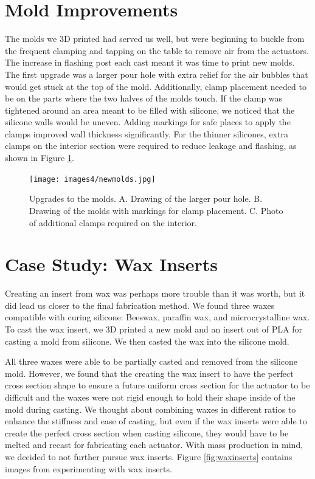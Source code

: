 \section{Mold Improvements}
The molds we 3D printed had served us well, but were beginning to buckle from the frequent clamping and tapping on the table to remove air from the actuators. The increase in flashing post each cast meant it was time to print new molds. The first upgrade was a larger pour hole with extra relief for the air bubbles that would get stuck at the top of the mold. Additionally, clamp placement needed to be on the parts where the two halves of the molds touch. If the clamp was tightened around an area meant to be filled with silicone, we noticed that the silicone walls would be uneven. Adding markings for safe places to apply the clamps improved wall thickness significantly. For the thinner silicones, extra clamps on the interior section were required to reduce leakage and flashing, as shown in Figure \ref{fig:newmolds}.

\begin{figure}[h]
    \centering
    \texttt{[image: images4/newmolds.jpg]}
    \caption{Upgrades to the molds. A. Drawing of the larger pour hole. B. Drawing of the molds with markings for clamp placement. C. Photo of additional clamps required on the interior.}
    \label{fig:newmolds}
\end{figure}

\section{Case Study: Wax Inserts}

Creating an insert from wax was perhaps more trouble than it was worth, but it did lead us closer to the final fabrication method. We found three waxes compatible with curing silicone: Beeswax, paraffin wax, and microcrystalline wax. To cast the wax insert, we 3D printed a new mold and an insert out of PLA for casting a mold from silicone. We then casted the wax into the silicone mold. 

All three waxes were able to be partially casted and removed from the silicone mold. However, we found that the creating the wax insert to have the perfect cross section shape to ensure a future uniform cross section for the actuator to be difficult and the waxes were not rigid enough to hold their shape inside of the mold during casting. We thought about combining waxes in different ratios to enhance the stiffness and ease of casting, but even if the wax inserts were able to create the perfect cross section when casting silicone, they would have to be melted and recast for fabricating each actuator. With mass production in mind, we decided to not further pursue wax inserts. Figure \ref{fig:waxinserts} contains images from experimenting with wax inserts. 

